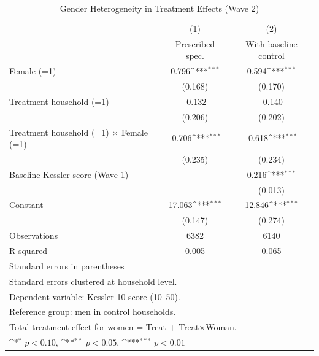 \begin{table}[htbp]\centering
\def\sym#1{\ifmmode^{#1}\else\(^{#1}\)\fi}
\caption{Gender Heterogeneity in Treatment Effects (Wave 2)}
\begin{tabular}{l*{2}{c}}
\toprule
                    &\multicolumn{1}{c}{(1)}&\multicolumn{1}{c}{(2)}\\
                    &\multicolumn{1}{c}{Prescribed spec.}&\multicolumn{1}{c}{With baseline control}\\
\midrule
Female (=1)         &       0.796\sym{***}&       0.594\sym{***}\\
                    &     (0.168)         &     (0.170)         \\
\addlinespace
Treatment household (=1)&      -0.132         &      -0.140         \\
                    &     (0.206)         &     (0.202)         \\
\addlinespace
Treatment household (=1) $\times$ Female (=1)&      -0.706\sym{***}&      -0.618\sym{***}\\
                    &     (0.235)         &     (0.234)         \\
\addlinespace
Baseline Kessler score (Wave 1)&                     &       0.216\sym{***}\\
                    &                     &     (0.013)         \\
\addlinespace
Constant            &      17.063\sym{***}&      12.846\sym{***}\\
                    &     (0.147)         &     (0.274)         \\
\midrule
Observations        &        6382         &        6140         \\
R-squared           &       0.005         &       0.065         \\
\bottomrule
\multicolumn{3}{l}{\footnotesize Standard errors in parentheses}\\
\multicolumn{3}{l}{\footnotesize Standard errors clustered at household level.}\\
\multicolumn{3}{l}{\footnotesize Dependent variable: Kessler-10 score (10–50).}\\
\multicolumn{3}{l}{\footnotesize Reference group: men in control households.}\\
\multicolumn{3}{l}{\footnotesize Total treatment effect for women = Treat + Treat×Woman.}\\
\multicolumn{3}{l}{\footnotesize \sym{*} \(p<0.10\), \sym{**} \(p<0.05\), \sym{***} \(p<0.01\)}\\
\end{tabular}
\end{table}
